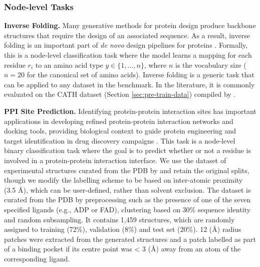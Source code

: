 
\subsubsection{Node-level Tasks}

\textbf{Inverse Folding. }
\label{sec:inverse-folding} 
Many generative methods for protein design produce backbone structures that require the design of an associated sequence. As a result, inverse folding is an important part of \emph{de novo} design pipelines for proteins \citep{Dauparas2022}.
Formally, this is a node-level classification task where the model learns a mapping for each residue $r_i$ to an amino acid type $y \in \{1, \dots, n \}$, where $n$ is the vocabulary size ($n=20$ for the canonical set of amino acids).
Inverse folding is a generic task that can be applied to any dataset in the benchmark. In the literature, it is commonly evaluated on the CATH dataset (Section \ref{sec:pre-train-data}) compiled by \citet{NEURIPS2019_f3a4ff48}.

\textbf{PPI Site Prediction. } 
Identifying protein-protein interaction sites has important applications in developing refined protein-protein interaction networks and docking tools, providing biological context to guide protein engineering and target identification in drug discovery campaigns \citep{Jamasb2021}.
This task is a node-level binary classification task where the goal is to predict whether or not a residue is involved in a protein-protein interaction interface.
We use the dataset of experimental structures curated from the PDB by \citet{gainza2020deciphering} and retain the original splits, though we modify the labelling scheme to be based on inter-atomic proximity (3.5 \AA), which can be user-defined, rather than solvent exclusion. The dataset is curated from the PDB by preprocessing such as the presence of one of the seven specified ligands (e.g., ADP or FAD), clustering based on 30\% sequence identity and random subsampling. It contains 1,459 structures, which are randomly assigned to training (72\%), validation (8\%) and test set (20\%). 12 (\AA) radius patches were extracted from the generated structures and a patch labelled as part of a binding pocket if its centre point was < 3 (\AA) away from an atom of the corresponding ligand.

